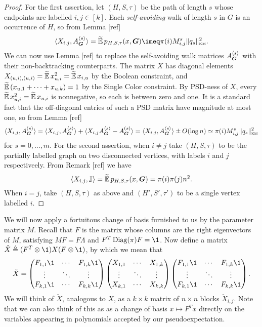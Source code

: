 \begin{proof}
    For the first assertion, let $(H,S,\tau)$ be the path of length $s$ whose endpoints are labelled $i,j\in[k]$. Each \textit{self-avoiding} walk of length $s$ in $G$ is an occurrence of $H$, so from Lemma [ref]
    $$
        \langle X_{i,j},\sa{s}{\bG}\rangle = \pseudo p_{H,S,\tau}(x,\bG) \imeq \pi(i)M_{i,j}^s \|q_s\|^2_{\km}.
    $$
    We can now use Lemma [ref] to replace the self-avoiding walk matrices $A^{\langle s \rangle}_{\boldsymbol{G}}$ with their non-backtracking counterparts. The matrix $X$ has diagonal elements $X_{(u,i),(u,i)} = \widetilde{\operatorname*{\mathbb{E}}}\, x_{u,i}^2 = \widetilde{\operatorname*{\mathbb{E}}}\, x_{i,u}$ by the Boolean constraint, and $\widetilde{\operatorname*{\mathbb{E}}}\, (x_{u,1} + \cdots + x_{u,k}) = 1$ by the Single Color constraint. By PSD-ness of $X$, every $\widetilde{\operatorname*{\mathbb{E}}}\, x_{u,i}^2 = \widetilde{\operatorname*{\mathbb{E}}}\, x_{u,i}$ is nonnegative, so each is between zero and one. It is a standard fact that the off-diagonal entries of such a PSD matrix have magnitude at most one, so from Lemma [ref]
    $$
        \langle X_{i,j}, A^{(s)}_{\boldsymbol{G}} \rangle = \langle X_{i,j}, A^{\langle s \rangle}_{\boldsymbol{G}} \rangle + \langle X_{i,j} A^{\langle s \rangle}_{\boldsymbol{G}} - A^{(s)}_{\boldsymbol{G}}\rangle = \langle X_{i,j}, A^{\langle s \rangle}_{\boldsymbol{G}} \rangle \pm O(\log n) \simeq \pi(i)M^s_{i,j} \|q_s\|^2_{\textsc{km}}
    $$
    for $s = 0,...,m$. For the second assertion, when $i\neq j$ take $(H,S,\tau)$ to be the partially labelled graph on two disconnected vertices, with labels $i$ and $j$ respectiveely. From Remark [ref] we have
    $$
        \langle X_{i,j},\mathbb{J} \rangle = \widetilde{\operatorname*{\mathbb{E}}}\, p_{H,S,\tau}(x,\boldsymbol{G}) = \pi(i)\pi(j)n^2.
    $$
    When $i=j$, take $(H,S,\tau)$ as above and $(H',S',\tau')$ to be a single vertex labelled $i$.
\end{proof}

We will now apply a fortuitous change of basis furnished to us by the parameter matrix $M$. Recall that $F$ is the matrix whose columns are the right eigenvectors of $M$, satisfying $MF = F\Lambda$ and $F^T\Diag(\pi)F = \1$. Now define a matrix $\check X \triangleq (F^T \otimes \1) X (F\otimes \1)$, by which we mean that 
$$
    \check X = \begin{pmatrix} F_{1,1}\1 & \cdots & F_{1,k}\1 \\
    \vdots & \ddots & \vdots \\
    F_{k,1}\1 & \cdots & F_{k,k}\1 
    \end{pmatrix} 
    \begin{pmatrix} X_{1,1} & \cdots & X_{1,k} \\
    \vdots & \ddots & \vdots \\
    X_{k,1} & \cdots & X_{k,k} 
    \end{pmatrix}
    \begin{pmatrix} F_{1,1}\1 & \cdots & F_{1,k}\1 \\
    \vdots & \ddots & \vdots \\
    F_{k,1}\1 & \cdots & F_{k,k}\1 
    \end{pmatrix}.
$$
We will think of $\check X$, analogous to $X$, as a $k\times k$ matrix of $n\times n$ blocks $\check X_{i,j}$. Note that we can also think of this as as a change of basis $x \mapsto F^T x$ directly on the variables appearing in polynomials accepted by our pseudoexpectation.

